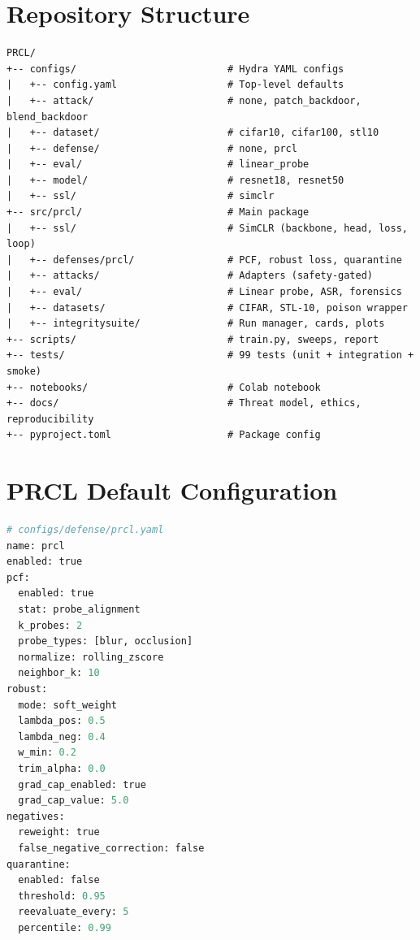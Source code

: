 \documentclass[11pt,a4paper]{article}
\begin{document}
\appendix

\section{Repository Structure}
\label{app:repo}

\begin{lstlisting}[basicstyle=\ttfamily\footnotesize]
PRCL/
+-- configs/                          # Hydra YAML configs
|   +-- config.yaml                   # Top-level defaults
|   +-- attack/                       # none, patch_backdoor, blend_backdoor
|   +-- dataset/                      # cifar10, cifar100, stl10
|   +-- defense/                      # none, prcl
|   +-- eval/                         # linear_probe
|   +-- model/                        # resnet18, resnet50
|   +-- ssl/                          # simclr
+-- src/prcl/                         # Main package
|   +-- ssl/                          # SimCLR (backbone, head, loss, loop)
|   +-- defenses/prcl/                # PCF, robust loss, quarantine
|   +-- attacks/                      # Adapters (safety-gated)
|   +-- eval/                         # Linear probe, ASR, forensics
|   +-- datasets/                     # CIFAR, STL-10, poison wrapper
|   +-- integritysuite/               # Run manager, cards, plots
+-- scripts/                          # train.py, sweeps, report
+-- tests/                            # 99 tests (unit + integration + smoke)
+-- notebooks/                        # Colab notebook
+-- docs/                             # Threat model, ethics, reproducibility
+-- pyproject.toml                    # Package config
\end{lstlisting}

\section{PRCL Default Configuration}
\label{app:config}

\begin{lstlisting}[language=Python,basicstyle=\ttfamily\footnotesize]
# configs/defense/prcl.yaml
name: prcl
enabled: true
pcf:
  enabled: true
  stat: probe_alignment
  k_probes: 2
  probe_types: [blur, occlusion]
  normalize: rolling_zscore
  neighbor_k: 10
robust:
  mode: soft_weight
  lambda_pos: 0.5
  lambda_neg: 0.4
  w_min: 0.2
  trim_alpha: 0.0
  grad_cap_enabled: true
  grad_cap_value: 5.0
negatives:
  reweight: true
  false_negative_correction: false
quarantine:
  enabled: false
  threshold: 0.95
  reevaluate_every: 5
  percentile: 0.99
\end{lstlisting}
\end{document}
